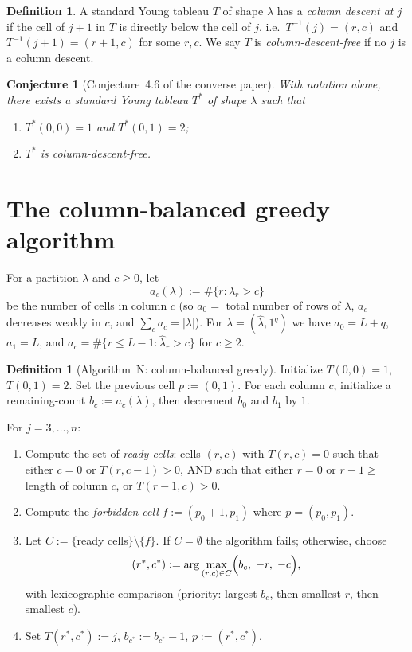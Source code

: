 \documentclass[11pt]{article}
\newtheorem{conjecture}[theorem]{Conjecture}
\theoremstyle{definition}
\newtheorem{definition}[theorem]{Definition}
\newcommand{\hatl}{\widehat\lambda}
\begin{document}
\begin{definition}\label{def:column-descent}
A standard Young tableau $T$ of shape $\lambda$ has a \emph{column
descent at $j$} if the cell of $j+1$ in $T$ is directly below the cell
of $j$, i.e.\ $T^{-1}(j) = (r, c)$ and $T^{-1}(j+1) = (r+1, c)$ for
some $r, c$.  We say $T$ is \emph{column-descent-free} if no $j$ is a
column descent.
\end{definition}

\begin{conjecture}[Conjecture~4.6 of the converse paper]\label{conj:main}
With notation above, there exists a standard Young tableau $T^*$ of
shape $\lambda$ such that
\begin{enumerate}[label=(\roman*)]
\item $T^*(0,0) = 1$ and $T^*(0,1) = 2$;
\item $T^*$ is column-descent-free.
\end{enumerate}
\end{conjecture}

\section{The column-balanced greedy algorithm}\label{sec:algorithm}

For a partition $\lambda$ and $c \ge 0$, let
\[
  a_c(\lambda) := \#\{ r : \lambda_r > c \}
\]
be the number of cells in column $c$ (so $a_0 = $ total number of rows
of $\lambda$, $a_c$ decreases weakly in $c$, and
$\sum_c a_c = |\lambda|$).  For $\lambda = (\hatl, 1^q)$ we have
$a_0 = L + q$, $a_1 = L$, and $a_c = \#\{r \le L-1 : \hatl_r > c\}$ for
$c \ge 2$.

\begin{definition}[Algorithm~N: column-balanced greedy]\label{def:algN}
Initialize $T(0,0) = 1$, $T(0,1) = 2$.  Set the previous cell
$p := (0,1)$.  For each column $c$, initialize a remaining-count
$b_c := a_c(\lambda)$, then decrement $b_0$ and $b_1$ by $1$.

For $j = 3, \ldots, n$:
\begin{enumerate}
\item Compute the set of \emph{ready cells}: cells $(r,c)$ with
  $T(r,c) = 0$ such that either $c = 0$ or $T(r, c-1) > 0$, AND such
  that either $r = 0$ or $r-1 \ge $ length of column $c$, or
  $T(r-1, c) > 0$.
\item Compute the \emph{forbidden cell} $f := (p_0 + 1, p_1)$ where
  $p = (p_0, p_1)$.
\item Let $C := \{$ready cells$\} \setminus \{f\}$.  If $C = \emptyset$
  the algorithm fails; otherwise, choose
  \[
    (r^*, c^*) := \arg\max_{(r,c) \in C}
       \Bigl( b_c, \; -r, \; -c \Bigr),
  \]
  with lexicographic comparison (priority: largest $b_c$, then smallest
  $r$, then smallest $c$).
\item Set $T(r^*, c^*) := j$, $b_{c^*} := b_{c^*} - 1$,
  $p := (r^*, c^*)$.
\end{enumerate}
\end{definition}
\end{document}
